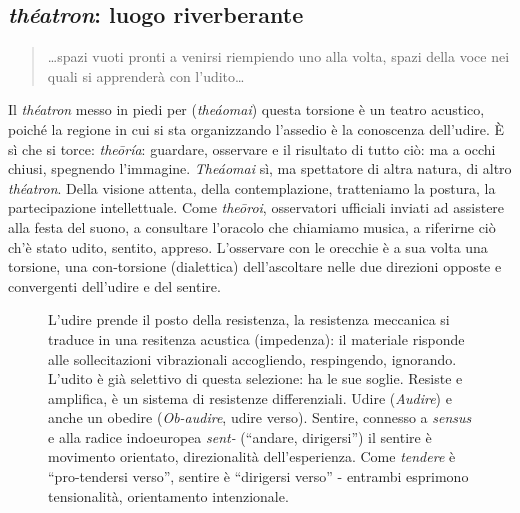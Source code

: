 \documentclass{gs}
\begin{document}
\subsection*{\emph{théatron}: luogo riverberante}

\begin{quote}
\begin{sf}
\small
\ldots spazi vuoti pronti a venirsi riempiendo uno alla volta, spazi della voce nei quali si apprenderà con l'udito\ldots~\cite{zambrano1991}
\end{sf}
\end{quote}

Il \emph{théatron} messo in piedi per (\emph{theáomai}) questa torsione è un teatro acustico, poiché la regione in cui si sta organizzando l'assedio è la conoscenza dell'udire. È sì che si torce: \emph{theōría}: guardare, osservare e il risultato di tutto ciò: ma a occhi chiusi, spegnendo l'immagine. \emph{Theáomai} sì, ma spettatore di altra natura, di altro \emph{théatron}. Della visione attenta, della contemplazione, tratteniamo la postura, la partecipazione intellettuale. Come \emph{theōroi}, osservatori ufficiali inviati ad assistere alla festa del suono, a consultare l'oracolo che chiamiamo musica, a riferirne ciò ch'è stato udito, sentito, appreso.  L'osservare con le orecchie è a sua volta una torsione, una con-torsione (dialettica) dell'ascoltare nelle due direzioni opposte e convergenti dell'udire e del sentire.

\begin{figure}[htbp]
\begin{center}
\caption{L'udire prende il posto della resistenza, la resistenza meccanica si traduce in una resitenza acustica (impedenza): il materiale risponde alle sollecitazioni vibrazionali accogliendo, respingendo, ignorando. L'udito è già selettivo di questa selezione: ha le sue soglie. Resiste e amplifica, è un sistema di resistenze differenziali. Udire (\emph{Audire}) e anche un obedire (\emph{Ob-audire}, udire verso). Sentire, connesso a \emph{sensus} e alla radice indoeuropea \emph{sent-} (“andare, dirigersi”) il sentire è movimento orientato, direzionalità dell'esperienza. Come \emph{tendere} è “pro-tendersi verso”, sentire è “dirigersi verso” - entrambi esprimono tensionalità, orientamento intenzionale.}
\label{ascoltare}
\end{center}
\end{figure}
\end{document}
